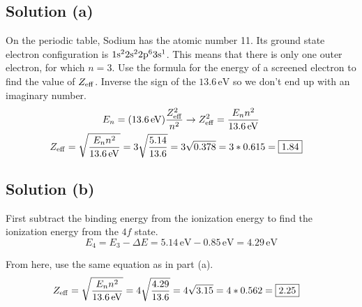 \documentclass[12pt]{article}
\begin{document}
        \subsection{Solution (a)}
            On the periodic table, Sodium has the atomic number 11.
            Its ground state electron configuration is $\rm 1s^2 2s^2 2p^6 3s^1$. 
            This means that there is only one outer electron, for which $n = 3$.
            Use the formula for the energy of a screened electron to find the value of $Z_{\rm eff}$.
            Inverse the sign of the $13.6\,\unit{\eV}$ so we don't end up with an imaginary number.
            \begin{gather}
                E_n = (13.6\,\unit{\eV}) \frac{Z_{\rm eff}^2}{n^2} \to Z_{\rm eff}^2 = \frac{E_n n^2}{13.6\,\unit{\eV}}\\
                \begin{align}
                    Z_{\rm eff} &=  \sqrt{\frac{E_n n^2}{13.6\,\unit{\eV}}}
                        =   3\sqrt{\frac{5.14}{13.6}}
                        =   3\sqrt{0.378}
                        =   3 * 0.615
                        =   \boxed{1.84}
                \end{align}
            \end{gather}

        \subsection{Solution (b)}
            First subtract the binding energy from the ionization energy to find the ionization energy from the $4f$ state.
            \begin{equation}
                E_4 =   E_3 - \Delta E
                    =   5.14\,\unit{\eV} - 0.85\,\unit{\eV}
                    =   4.29\,\unit{\eV}
            \end{equation}

            From here, use the same equation as in part (a).
            \begin{align}
                Z_{\rm eff} &=  \sqrt{\frac{E_n n^2}{13.6\,\unit{\eV}}}
                    =   4\sqrt{\frac{4.29}{13.6}}
                    =   4\sqrt{3.15}
                    =   4 * 0.562
                    =   \boxed{2.25}
            \end{align}
\end{document}
